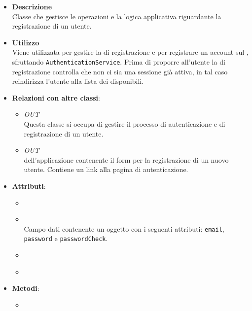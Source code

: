 \begin{itemize}
\item \textbf{Descrizione}\\
Classe che gestisce le operazioni e la logica applicativa riguardante la registrazione di un utente.
\item \textbf{Utilizzo}\\
Viene utilizzata per gestire la  di registrazione e per registrare un account sul , sfruttando \texttt{AuthenticationService}.
Prima di proporre all’utente la  di registrazione controlla che non ci sia una sessione già attiva, in tal caso reindirizza l’utente alla lista dei  disponibili.
\item \textbf{Relazioni con altre classi}:
\begin{itemize}
\item \textit{OUT} \hyperref[\nogloxy{Premi::Front-End::Services::AuthenticationService}]{}\\
Questa classe si occupa di gestire il processo di autenticazione e di registrazione di un utente.
\item \textit{OUT} \hyperref[\nogloxy{Premi::Front-End::Views::RegistrationView}]{}\\
 dell’applicazione contenente il form per la registrazione di un nuovo utente. Contiene un link alla pagina di autenticazione.
\end{itemize}
\item \textbf{Attributi}:
\begin{itemize}
\item {}
\\ \dpAuthenticationServiceField
\item {}
\\ Campo dati contenente un oggetto con i seguenti attributi: \texttt{email}, \texttt{password} e \texttt{passwordCheck}.
\item {}
\\ \dpLocationField
\item {}
\\ \dpScopeField
\end{itemize}
\item \textbf{Metodi}:
\begin{itemize}
\item {}

\end{itemize}
\end{itemize}
